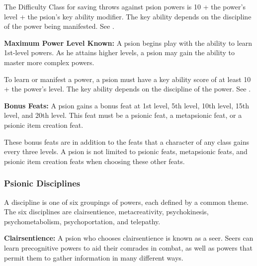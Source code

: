 The Difficulty Class for saving throws against psion powers is 10 + the power's level + the psion's key ability modifier. The key ability depends on the discipline of the power being manifested. See .


\textbf{Maximum Power Level Known:} A psion begins play with the ability to learn 1st-level powers. As he attains higher levels, a psion may gain the ability to master more complex powers.

To learn or manifest a power, a psion must have a key ability score of at least 10 + the power's level. The key ability depends on the discipline of the power. See .

\textbf{Bonus Feats:} A psion gains a bonus feat at 1st level, 5th level, 10th level, 15th level, and 20th level. This feat must be a psionic feat, a metapsionic feat, or a psionic item creation feat.

These bonus feats are in addition to the feats that a character of any class gains every three levels. A psion is not limited to psionic feats, metapsionic feats, and psionic item creation feats when choosing these other feats.

\subsubsection{Psionic Disciplines}
A discipline is one of six groupings of powers, each defined by a common theme. The six disciplines are clairsentience, metacreativity, psychokinesis, psychometabolism, psychoportation, and telepathy.

\textbf{Clairsentience:} A psion who chooses clairsentience is known as a seer. Seers can learn precognitive powers to aid their comrades in combat, as well as powers that permit them to gather information in many different ways.

